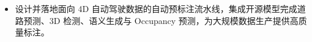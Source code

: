 \begin{itemize}
  \item 设计并落地面向 4D 自动驾驶数据的自动预标注流水线，集成开源模型完成道路预测、3D 检测、语义生成与 Occupancy 预测，为大规模数据生产提供高质量标注。
\end{itemize}
